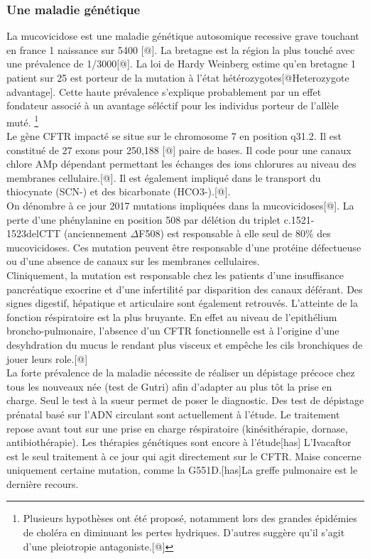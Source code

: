 \documentclass[12pt,a4paper]{article}
\begin{document}
\subsubsection{Une maladie génétique}
La mucovicidose est une maladie génétique autosomique recessive grave touchant en france 1 naissance sur 5400 [@]. La bretagne est la région la plus touché avec une prévalence de 1/3000[@].
La loi de Hardy Weinberg estime qu’en bretagne 1 patient sur 25 est porteur de la mutation à l’état hétérozygotes[@Heterozygote advantage]. Cette haute prévalence s’explique probablement par un effet fondateur associé à un avantage séléctif pour les individus porteur de l’allèle muté. \footnote{Plusieurs hypothèses ont été proposé, notamment lors des grandes épidémies de choléra en diminuant les pertes hydriques. D’autres suggère qu'il s'agit d'une pleiotropie antagoniste.[@]} \\
Le gène CFTR impacté se situe sur le chromosome 7 en position q31.2. Il est constitué de 27 exons pour 250,188 [@] paire de bases. Il code pour une canaux chlore AMp dépendant permettant les échanges des ions chlorures au niveau des membranes cellulaire.[@]. Il est également impliqué dans le transport du thiocynate (SCN-) et des bicarbonate (HCO3-).[@]. \\
On dénombre à ce jour 2017 mutations impliquées dans la mucovicidoses[@]. La perte d’une phénylanine en position 508 par délétion du triplet c.1521-1523delCTT (anciennement $\Delta$F508) est responsable à elle seul de 80\% des mucovicidoses.
Ces mutation peuvent être responsable d’une protéine défectueuse ou d’une absence de canaux sur les membranes cellulaires. \\
Cliniquement, la mutation est responsable chez les patients d’une insuffisance pancréatique exocrine et d’une infertilité par disparition des canaux déférant. Des signes digestif, hépatique et articulaire sont également retrouvés.
L'atteinte de la fonction réspiratoire est la plus bruyante. En effet au niveau de l’epithélium broncho-pulmonaire, l’absence d’un CFTR fonctionnelle est à l’origine d’une desyhdration du mucus le rendant plus visceux et empêche les cils bronchiques de jouer leurs role.[@]\\
La forte prévalence de la maladie nécessite de réaliser un dépistage précoce chez tous les nouveaux née (test de Gutri) afin d’adapter au plus tôt la prise en charge. Seul le test à la sueur permet de poser le diagnostic. Des test de dépistage prénatal basé sur l’ADN circulant sont actuellement à l’étude. Le traitement repose avant tout sur une prise en charge réspiratoire (kinésithérapie, dornase, antibiothérapie).
Les thérapies génétiques sont encore à l’étude[has]
L’Ivacaftor est le seul traitement à ce jour qui agit directement sur le CFTR. Maise concerne uniquement certaine mutation, comme la G551D.[has]La greffe pulmonaire est le dernière recours.
\end{document}
